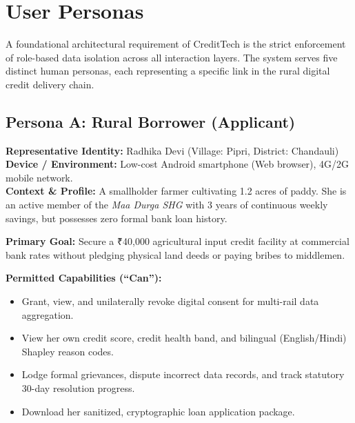 \chapter{User Personas}
\label{chap:user_personas}

A foundational architectural requirement of CreditTech is the strict enforcement of role-based data isolation across all interaction layers. The system serves five distinct human personas, each representing a specific link in the rural digital credit delivery chain.

\section{Persona A: Rural Borrower (Applicant)}
\noindent\textbf{Representative Identity:} Radhika Devi (Village: Pipri, District: Chandauli)\\
\textbf{Device / Environment:} Low-cost Android smartphone (Web browser), 4G/2G mobile network.\\
\textbf{Context \& Profile:} A smallholder farmer cultivating 1.2 acres of paddy. She is an active member of the \textit{Maa Durga SHG} with 3 years of continuous weekly savings, but possesses zero formal bank loan history.

\vspace{0.2cm}
\noindent\textbf{Primary Goal:} Secure a ₹40,000 agricultural input credit facility at commercial bank rates without pledging physical land deeds or paying bribes to middlemen.

\vspace{0.2cm}
\noindent\textbf{Permitted Capabilities (``Can''):}
\begin{itemize}[leftmargin=1.5em, itemsep=1pt]
  \item Grant, view, and unilaterally revoke digital consent for multi-rail data aggregation.
  \item View her own credit score, credit health band, and bilingual (English/Hindi) Shapley reason codes.
  \item Lodge formal grievances, dispute incorrect data records, and track statutory 30-day resolution progress.
  \item Download her sanitized, cryptographic loan application package.
\end{itemize}

